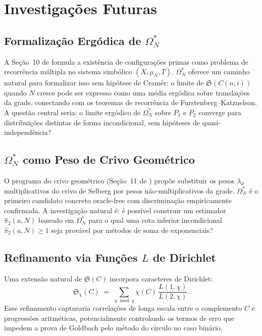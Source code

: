 \documentclass[12pt,a4paper]{article}
\theoremstyle{definition}
\theoremstyle{remark}
\newcommand{\Oms}{\Omega^*_N}        %
\newcommand{\Ss}{\mathfrak{S}}       %
\begin{document}
	\section{Investigações Futuras}
	
	\subsection{Formalização Ergódica de $\Oms$}
	
	A Seção~10 de \cite{bandeira2026unif} formula a existência de configurações
	primas como problema de recorrência múltipla no sistema simbólico
	$(X,\mu_N,T)$.
	$\Oms$ oferece um caminho natural para formalizar isso sem hipótese de
	Cramér: o limite de $\Ss(C(n,i))$ quando $N$ cresce pode ser expresso como
	uma média ergódica sobre translações da grade, conectando com os teoremas
	de recorrência de Furstenberg--Katznelson.
	A questão central seria: o limite ergódico de $\Oms$ sobre $P_1$ e $P_2$
	converge para distribuições distintas de forma incondicional, sem hipóteses
	de quasi-independência?
	
	\subsection{$\Oms$ como Peso de Crivo Geométrico}
	
	O programa do crivo geométrico (Seção~11 de \cite{bandeira2026unif}) propõe
	substituir os pesos $\lambda_d$ multiplicativos do crivo de Selberg por
	pesos não-multiplicativos da grade.
	$\Oms$ é o primeiro candidato concreto oracle-free com discriminação
	empiricamente confirmada.
	A investigação natural é: é possível construir um estimador
	$\hat\pi_2(a,N)$ baseado em $\Oms$ para o qual uma cota inferior
	incondicional $\hat\pi_2(a,N)\geq1$ seja provável por métodos de soma de
	exponenciais?
	
	\subsection{Refinamento via Funções $L$ de Dirichlet}
	
	Uma extensão natural de $\Ss(C)$ incorpora caracteres de Dirichlet:
	\[
	\Ss_\chi(C) \;=\;\sum_{\chi\bmod q}\chi(C)\,\frac{L(1,\chi)}{L(2,\chi)}.
	\]
	Esse refinamento capturaria correlações de longa escala entre o complemento
	$C$ e progressões aritméticas, potencialmente controlando os termos de erro
	que impedem a prova de Goldbach pelo método do círculo no caso binário.
	
\end{document}
